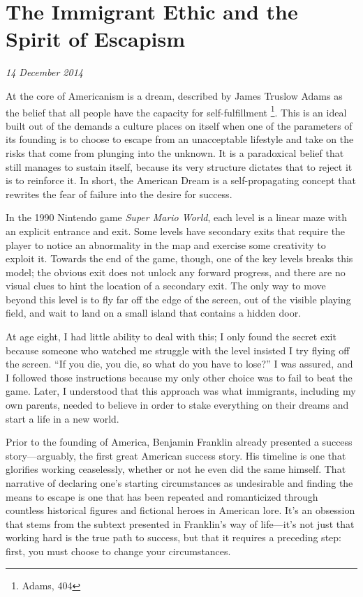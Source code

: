 \section{The Immigrant Ethic and the Spirit of Escapism}

\textit{14 December 2014}


At the core of Americanism is a dream, described by James Truslow Adams as the
belief that all people have the capacity for self-fulfillment \footnote{Adams,
404}. This is an ideal built out of the demands a culture places on itself when
one of the parameters of its founding is to choose to escape from an
unacceptable lifestyle and take on the risks that come from plunging into the
unknown. It is a paradoxical belief that still manages to sustain itself,
because its very structure dictates that to reject it is to reinforce it.  In
short, the American Dream is a self-propagating concept that rewrites the fear
of failure into the desire for success.

In the 1990 Nintendo game \textit{Super Mario World}, each level is a linear maze with an
explicit entrance and exit. Some levels have secondary exits that require the
player to notice an abnormality in the map and exercise some creativity to
exploit it. Towards the end of the game, though, one of the key levels breaks this model; the obvious
exit does not unlock any forward progress, and there are no visual clues to
hint the location of a secondary exit. The only way to move beyond this
level is to fly far off the edge of the screen, out of the visible playing
field, and wait to land on a small island that contains a hidden door.

At age eight, I had little ability to deal with this; I only found the secret
exit because someone who watched me struggle with the level insisted I try
flying off the screen. ``If you die, you die, so what do you have to lose?'' I
was assured, and I followed those instructions because my only other choice
was to fail to beat the game. Later, I understood that this approach was what immigrants, including my
own parents, needed to believe in order to stake everything on their dreams and
start a life in a new world.

Prior to the founding of America, Benjamin Franklin already presented a
success story---arguably, the first great American success story. His
timeline is one that glorifies working ceaselessly, whether or
not he even did the same himself. That narrative of declaring one's starting
circumstances as undesirable and finding the means to escape is one that has
been repeated and romanticized through countless historical figures and
fictional heroes in American lore. It's an obsession that stems from the subtext
presented in Franklin's way of life---it's not just that working hard is the
true path to success, but that it requires a preceding step: first, you must
choose to change your circumstances.


